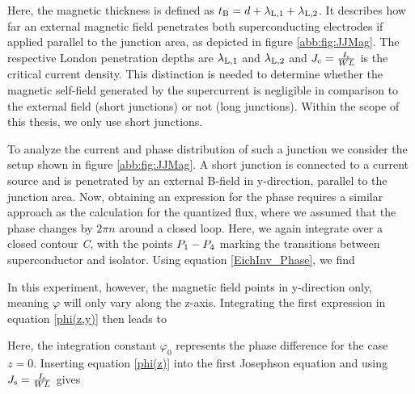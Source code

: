 
Here, the magnetic thickness is defined as $t_{\rm B} = d + \lambda_{\rm L,1} + \lambda_{\rm L,2}$. It describes how far an external magnetic field penetrates both superconducting electrodes if applied parallel to the junction area, as depicted in figure \ref{abb:fig:JJMag}. The respective London penetration depths are $\lambda_{\rm L,1}$ and $\lambda_{\rm L,2}$ and $J_{\rm c} = \frac{I_{\rm c}}{WL}$ is the critical current density.
This distinction is needed to determine whether the magnetic self-field generated by the supercurrent is negligible in comparison to the external field (short junctions) or not (long junctions). Within the scope of this thesis, we only use short junctions.  

To analyze the current and phase distribution of such a junction we consider the setup shown in figure \ref{abb:fig:JJMag}. A short junction is connected to a current source and is penetrated by an external B-field in y-direction, parallel to the junction area. Now, obtaining an expression for the phase requires a similar approach as the calculation for the quantized flux, where we assumed that the phase changes by $2\pi n$ around a closed loop. Here, we again integrate over a closed contour \textit{C}, with the points $P_{\rm 1}-P_{\rm 4}$ marking the transitions between superconductor and isolator. Using equation \ref{EichInv_Phase}, we find 


In this experiment, however, the magnetic field points in y-direction only, meaning $\varphi$ will only vary along the z-axis. Integrating the first expression in equation \ref{phi(z,y)} then leads to


Here, the integration constant $\varphi_0$ represents the phase difference for the case $z=0$. Inserting equation \ref{phi(z)} into the first Josephson equation and using $J_{\rm s} = \frac{I_{\rm s}}{WL}$ gives 


